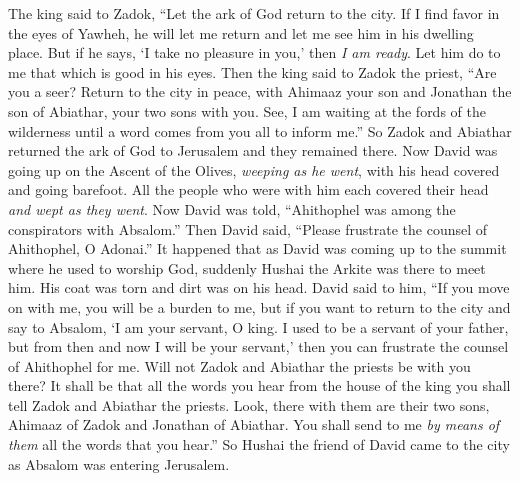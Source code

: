 \begin{biblechapter}
\verse The king said to Zadok, “Let the ark of God return to the city. If I find favor in the eyes of Yawheh, he will let me return and let me see him in his dwelling place.
\verse But if he says, ‘I take no pleasure in you,’ then \textit{I am ready}. Let him do to me that which is good in his eyes.
\verse Then the king said to Zadok the priest, “Are you a seer? Return to the city in peace, with Ahimaaz your son and Jonathan the son of Abiathar, your two sons with you.
\verse See, I am waiting at the fords of the wilderness until a word comes from you all to inform me.”
\verse So Zadok and Abiathar returned the ark of God to Jerusalem and they remained there.
 Now David was going up on the Ascent of the Olives, \textit{weeping as he went}, with his head covered and going barefoot. All the people who were with him each covered their head \textit{and wept as they went}.
\verse Now David was told, “Ahithophel was among the conspirators with Absalom.” Then David said, “Please frustrate the counsel of Ahithophel, O Adonai.”
\verse It happened that as David was coming up to the summit where he used to worship God, suddenly Hushai the Arkite was there to meet him. His coat was torn and dirt was on his head.
\verse David said to him, “If you move on with me, you will be a burden to me,
\verse but if you want to return to the city and say to Absalom, ‘I am your servant, O king. I used to be a servant of your father, but from then and now I will be your servant,’ then you can frustrate the counsel of Ahithophel for me.
\verse Will not Zadok and Abiathar the priests be with you there? It shall be that all the words you hear from the house of the king you shall tell Zadok and Abiathar the priests.
\verse Look, there with them are their two sons, Ahimaaz of Zadok and Jonathan of Abiathar. You shall send to me \textit{by means of them} all the words that you hear.”
\verse So Hushai the friend of David came to the city as Absalom was entering Jerusalem.
\end{biblechapter}

